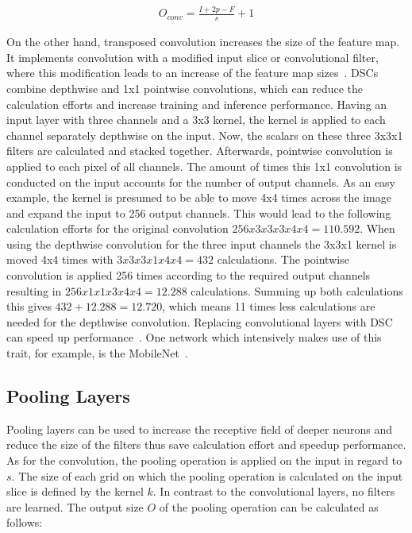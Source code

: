 \begin{align}
    O_{conv}=\frac{I+2p-F}{s}+1
\end{align}

On the other hand, transposed convolution increases the size of the feature map.
It implements convolution with a modified input slice or convolutional filter, where this modification leads
to an increase of the feature map sizes~\cite{deconv}.
\glspl{DSC} combine depthwise and 1x1 pointwise convolutions, which can reduce the calculation efforts and increase
training and inference performance.
Having an input layer with three channels and a 3x3 kernel, the kernel is applied to each channel
separately depthwise on the input.
Now, the scalars on these three 3x3x1 filters are calculated and stacked together.
Afterwards, pointwise convolution is applied to each pixel of all channels.
The amount of times this 1x1 convolution is conducted on the input accounts for the number of output channels.
As an easy example, the kernel is presumed to be able to move 4x4 times across the image and expand the input to 256 output channels.
This would lead to the following calculation efforts for the original convolution
$256x3x3x3x4x4=110.592$.
When using the depthwise convolution for the three input channels the 3x3x1 kernel is moved 4x4 times
with $3x3x3x1x4x4=432$ calculations.
The pointwise convolution is applied 256 times according to the required output channels resulting in
$256x1x1x3x4x4=12.288$ calculations.
Summing up both calculations this gives $432+12.288=12.720$,
which means 11 times less calculations are needed for the depthwise convolution.
Replacing convolutional layers with \gls{DSC} can speed up performance~\cite{advanceddeeplearningpython}.
One network which intensively makes use of this trait, for example, is the MobileNet~\cite{mobilenet}.


\subsection{Pooling Layers}
Pooling layers can be used to increase the receptive field of deeper neurons and reduce the size of the filters
thus save calculation effort and speedup performance.
As for the convolution, the pooling operation is applied on the input in regard to $s$.
The size of each grid on which the pooling operation is calculated on the input slice is defined by the kernel $k$.
In contrast to the convolutional layers, no filters are learned.
The output size $O$ of the pooling operation can be calculated as follows:

